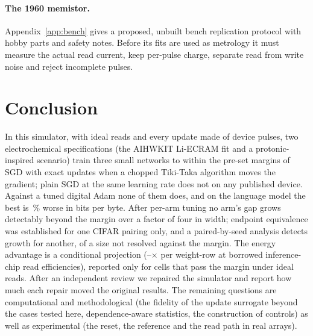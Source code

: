 \paragraph{The 1960 memistor.} Appendix~\ref{app:bench} gives a proposed, unbuilt bench replication protocol with hobby parts and
safety notes. Before its fits are used as metrology it must measure the actual read current, keep per-pulse charge, separate
read from write noise and reject incomplete pulses.

\section{Conclusion}
In this simulator, with ideal reads and every update made of device pulses, two electrochemical specifications (the AIHWKIT
Li-ECRAM fit and a protonic-inspired scenario) train three small networks to within the pre-set margins of SGD with exact updates
when a chopped Tiki-Taka algorithm moves the gradient; plain SGD at the same learning rate does not on any published device. Against
a tuned digital Adam none of them does, and on the language model the best is \RVLmAdamBestGap\,\% worse in bits per byte. After
per-arm tuning no arm's gap grows detectably beyond the margin over a factor of four in width; endpoint equivalence was established
for one CIFAR pairing only, and a paired-by-seed analysis detects growth for another, of a size not resolved against
the margin. The energy advantage is a
conditional projection (\RVenSysMin--\RVenChipMax$\times$ per weight-row at borrowed inference-chip read efficiencies), reported
only for cells that pass the margin under ideal reads. After an independent review we repaired the simulator and report how much each repair moved the
original results. The remaining questions are computational and methodological (the fidelity of the update surrogate beyond the cases tested
here, dependence-aware statistics, the construction of controls) as well as experimental (the reset, the reference and the read
path in real arrays).
